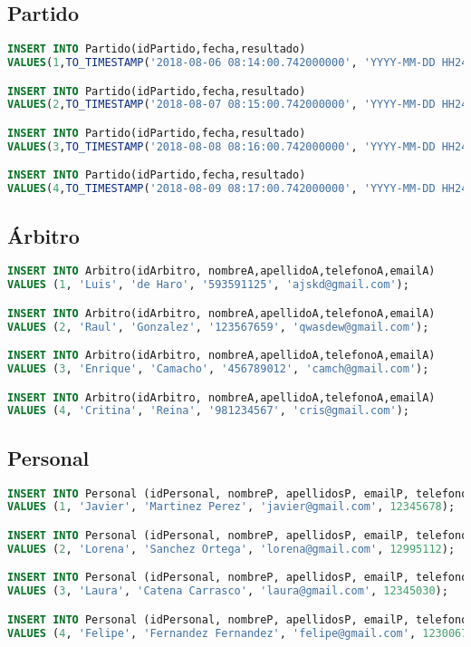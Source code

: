 \subsection{Partido}
\begin{lstlisting}[language=sql]
INSERT INTO Partido(idPartido,fecha,resultado)
VALUES(1,TO_TIMESTAMP('2018-08-06 08:14:00.742000000', 'YYYY-MM-DD HH24:MI:SS.FF'),15);

INSERT INTO Partido(idPartido,fecha,resultado)
VALUES(2,TO_TIMESTAMP('2018-08-07 08:15:00.742000000', 'YYYY-MM-DD HH24:MI:SS.FF'),17);

INSERT INTO Partido(idPartido,fecha,resultado)
VALUES(3,TO_TIMESTAMP('2018-08-08 08:16:00.742000000', 'YYYY-MM-DD HH24:MI:SS.FF'),18);

INSERT INTO Partido(idPartido,fecha,resultado)
VALUES(4,TO_TIMESTAMP('2018-08-09 08:17:00.742000000', 'YYYY-MM-DD HH24:MI:SS.FF'),19);
\end{lstlisting}

\pagebreak

\subsection{Árbitro}
\begin{lstlisting}[language=sql]
INSERT INTO Arbitro(idArbitro, nombreA,apellidoA,telefonoA,emailA)
VALUES (1, 'Luis', 'de Haro', '593591125', 'ajskd@gmail.com');

INSERT INTO Arbitro(idArbitro, nombreA,apellidoA,telefonoA,emailA)
VALUES (2, 'Raul', 'Gonzalez', '123567659', 'qwasdew@gmail.com');

INSERT INTO Arbitro(idArbitro, nombreA,apellidoA,telefonoA,emailA)
VALUES (3, 'Enrique', 'Camacho', '456789012', 'camch@gmail.com');

INSERT INTO Arbitro(idArbitro, nombreA,apellidoA,telefonoA,emailA)
VALUES (4, 'Critina', 'Reina', '981234567', 'cris@gmail.com');
\end{lstlisting}

\subsection{Personal}
\begin{lstlisting}[language=sql]
INSERT INTO Personal (idPersonal, nombreP, apellidosP, emailP, telefonoP)
VALUES (1, 'Javier', 'Martinez Perez', 'javier@gmail.com', 12345678);

INSERT INTO Personal (idPersonal, nombreP, apellidosP, emailP, telefonoP)
VALUES (2, 'Lorena', 'Sanchez Ortega', 'lorena@gmail.com', 12995112);

INSERT INTO Personal (idPersonal, nombreP, apellidosP, emailP, telefonoP)
VALUES (3, 'Laura', 'Catena Carrasco', 'laura@gmail.com', 12345030);

INSERT INTO Personal (idPersonal, nombreP, apellidosP, emailP, telefonoP)
VALUES (4, 'Felipe', 'Fernandez Fernandez', 'felipe@gmail.com', 12300678);
\end{lstlisting}

